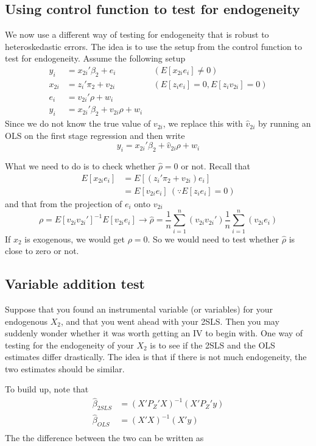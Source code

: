\documentclass[12pt]{article}
\theoremstyle{definition}
\theoremstyle{property}
\theoremstyle{assumption}
\theoremstyle{example}
\theoremstyle{comment}
\begin{document}
\subsection{Using control function to test for endogeneity}
We now use a different way of testing for endogeneity that is robust to heteroskedastic errors. The idea is to use the setup from the control function to test for endogeneity. Assume the following setup
\[
\begin{aligned}
y_i &= x_{2i}'\beta_2+e_i& \ \ (E[x_{2i}e_i]\neq0) \\
x_{2i}&=z_i'\pi_2 + v_{2i}& \ \ (E[z_ie_i]=0, E[z_iv_{2i}]=0)\\
e_i &=v_{2i}'\rho + w_i&\\
y_i &= x_{2i}'\beta_2+v_{2i}\rho + w_i
\end{aligned}
\]
Since we do not know the true value of $v_{2i}$, we replace this with $\hat{v}_{2i}$ by running an OLS on the first stage regression  and then write
\[
y_i = x_{2i}'\beta_2+\hat{v}_{2i}\rho + w_i
\] \par
What we need to do is to check whether $\hat{\rho}=0$ or not. Recall that
\[
\begin{aligned}
E[x_{2i}e_i]&=E[(z_i'\pi_2 + v_{2i})e_i]\\
&=E[v_{2i}e_i] \ (\because E[z_ie_i]=0)
\end{aligned}
\]
and that from the projection of $e_i$ onto $v_{2i}$
\[
\rho = E[v_{2i}v_{2i}']^{-1}E[v_{2i}e_i]\to\hat{\rho}=\frac{1}{n}\sum_{i=1}^n(v_{2i}v_{2i}') \frac{1}{n}\sum_{i=1}^n(v_{2i}e_i)
\]
If $x_2$ is exogenous, we would get $\rho=0$. So we would need to test whether $\hat{\rho}$ is close to zero or not. 
\subsection{Variable addition test}
Suppose that you found an instrumental variable (or variables) for your endogenous $X_2$, and that you went ahead with your 2SLS. Then you may suddenly wonder whether it was worth getting an IV to begin with. One way of testing for the endogeneity of your $X_2$ is to see if the 2SLS and the OLS estimates differ drastically. The idea is that if there is not much endogeneity, the two estimates should be similar.
\par 
To build up, note that
\[
\begin{aligned}
\hat{\beta}_{2SLS}&=(X'P_Z'X)^{-1}(X'P_Z'y)\\
\hat{\beta}_{OLS}&=(X'X)^{-1}(X'y)\\
\end{aligned}
\]
The the difference between the two can be written as
\end{document}
